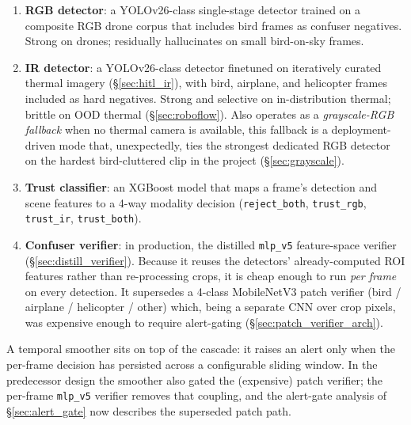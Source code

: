 \documentclass[12pt,a4paper,oneside,openright]{book}
\begin{document}
\begin{enumerate}
    \item \textbf{RGB detector}: a YOLOv26-class single-stage detector trained on a composite RGB drone corpus that includes bird frames as confuser negatives. Strong on drones; residually hallucinates on small bird-on-sky frames.
    \item \textbf{IR detector}: a YOLOv26-class detector finetuned on iteratively curated thermal imagery (\S\ref{sec:hitl_ir}), with bird, airplane, and helicopter frames included as hard negatives. Strong and selective on in-distribution thermal; brittle on OOD thermal (\S\ref{sec:roboflow}). Also operates as a \emph{grayscale-RGB fallback} when no thermal camera is available, this fallback is a deployment-driven mode that, unexpectedly, ties the strongest dedicated RGB detector on the hardest bird-cluttered clip in the project (\S\ref{sec:grayscale}).
    \item \textbf{Trust classifier}: an XGBoost model that maps a frame's detection and scene features to a 4-way modality decision (\texttt{reject\_both}, \texttt{trust\_rgb}, \texttt{trust\_ir}, \texttt{trust\_both}).
    \item \textbf{Confuser verifier}: in production, the distilled \texttt{mlp\_v5} feature-space verifier (\S\ref{sec:distill_verifier}). Because it reuses the detectors' already-computed ROI features rather than re-processing crops, it is cheap enough to run \emph{per frame} on every detection. It supersedes a 4-class MobileNetV3 patch verifier (bird / airplane / helicopter / other) which, being a separate CNN over crop pixels, was expensive enough to require alert-gating (\S\ref{sec:patch_verifier_arch}).
\end{enumerate}

A temporal smoother sits on top of the cascade: it raises an alert only when the per-frame decision has persisted across a configurable sliding window. In the predecessor design the smoother also gated the (expensive) patch verifier; the per-frame \texttt{mlp\_v5} verifier removes that coupling, and the alert-gate analysis of \S\ref{sec:alert_gate} now describes the superseded patch path.
\end{document}
